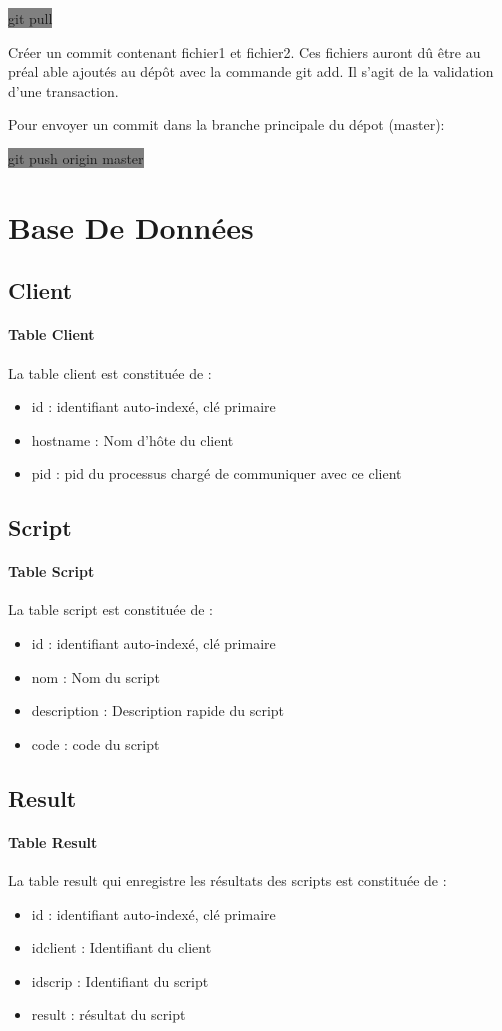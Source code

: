 \documentclass[11pt,a4paper,titlepage, oneside]{article}
\begin{document}
			\colorbox{gray}{git pull}

			Créer un commit contenant fichier1 et fichier2. Ces fichiers auront dû être au préal able ajoutés au dépôt avec la commande git add. Il s'agit de la validation d'une transaction. 

			Pour envoyer un commit dans la branche principale du dépot (master):
			
			\colorbox{gray}{git push origin master}	

\newpage
\section{{\color{red} Base De Données}}
	\subsection{{\color{blue}Client}}
		\paragraph{Table Client}
			La table client est constituée de :
			\begin{itemize}
				\item id : identifiant auto-indexé, clé primaire
				\item hostname : Nom d'hôte du client
				\item pid : pid du processus chargé de communiquer avec ce client
			\end{itemize}
	\subsection{{\color{blue} Script}}
		\paragraph{Table Script}
			La table script est constituée de :
			\begin{itemize}
				\item id : identifiant auto-indexé, clé primaire
				\item nom : Nom du script
				\item description : Description rapide du script
				\item code : code du script
			\end{itemize}
	\subsection{{\color{blue}Result}}
		\paragraph{Table Result}
			La table result qui enregistre les résultats des scripts est constituée de :
			\begin{itemize}
				\item id : identifiant auto-indexé, clé primaire
				\item idclient : Identifiant du client
				\item idscrip : Identifiant du script
				\item result : résultat du script
			\end{itemize}
		
\end{document}
